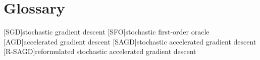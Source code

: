 
\chapter{Glossary}

\begin{acronym}[R-SAGD]
  [SGD]{stochastic gradient descent}
  [SFO]{stochastic first-order oracle}
  [AGD]{accelerated gradient descent}
  [SAGD]{stochastic accelerated gradient descent}
  [R-SAGD]{reformulated stochastic accelerated gradient descent}
\end{acronym}
